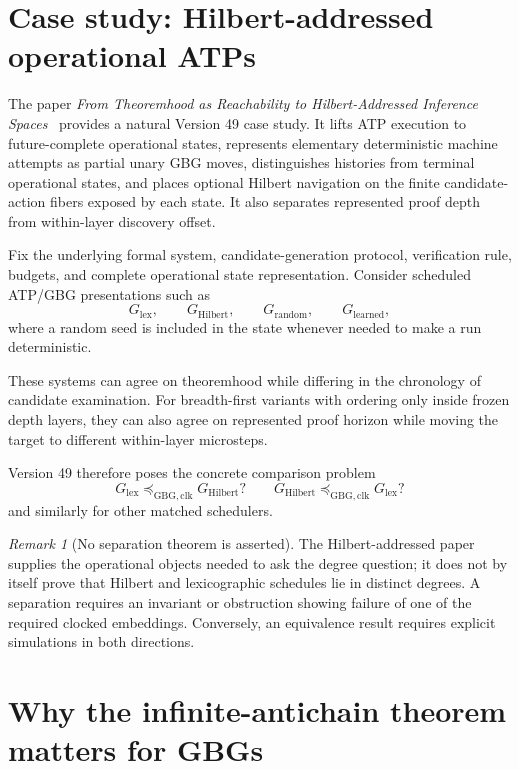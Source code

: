 \documentclass[11pt]{article}
\theoremstyle{remark}
\newtheorem{remark}[definition]{Remark}
\begin{document}
\section{Case study: Hilbert-addressed operational ATPs}

The paper \emph{From Theoremhood as Reachability to Hilbert-Addressed Inference Spaces}~\cite{TennesonHilbertReach} provides a
natural Version 49 case study.
It lifts ATP execution to future-complete operational states, represents elementary deterministic
machine attempts as partial unary GBG moves, distinguishes histories from terminal operational states,
and places optional Hilbert navigation on the finite candidate-action fibers exposed by each state.
It also separates represented proof depth from within-layer discovery offset.

Fix the underlying formal system, candidate-generation protocol, verification rule, budgets, and
complete operational state representation.
Consider scheduled ATP/GBG presentations such as
\[
G_{\mathrm{lex}},\qquad
G_{\mathrm{Hilbert}},\qquad
G_{\mathrm{random}},\qquad
G_{\mathrm{learned}},
\]
where a random seed is included in the state whenever needed to make a run deterministic.

These systems can agree on theoremhood while differing in the chronology of candidate examination.
For breadth-first variants with ordering only inside frozen depth layers, they can also agree on
represented proof horizon while moving the target to different within-layer microsteps.

Version 49 therefore poses the concrete comparison problem
\[
G_{\mathrm{lex}}\preceq_{\mathrm{GBG,clk}}G_{\mathrm{Hilbert}}?
\qquad
G_{\mathrm{Hilbert}}\preceq_{\mathrm{GBG,clk}}G_{\mathrm{lex}}?
\]
and similarly for other matched schedulers.

\begin{remark}[No separation theorem is asserted]
The Hilbert-addressed paper supplies the operational objects needed to ask the degree question;
it does not by itself prove that Hilbert and lexicographic schedules lie in distinct degrees.
A separation requires an invariant or obstruction showing failure of one of the required clocked
embeddings.
Conversely, an equivalence result requires explicit simulations in both directions.
\end{remark}

\section{Why the infinite-antichain theorem matters for GBGs}
\end{document}
